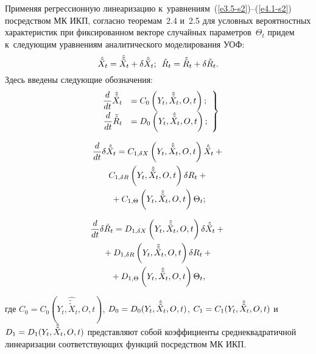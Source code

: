 \begin{multicols}{2}
Применяя регрессионную линеаризацию к~уравнениям~(\ref{e3.5-s2})--(\ref{e4.1-s2}) посредством 
МК ИКП, согласно тео\-ре\-мам~2.4 и~2.5 для условных вероятностных характеристик при 
фиксированном векторе случайных па\-ра\-мет\-ров~$\Theta_t$ придем к~сле\-ду\-ющим 
уравнениям аналитического моделирования УОФ:
  \begin{equation}
  \hat{\tilde X}_t = \hat{\tilde{\tilde X}}_t +\delta \hat{\tilde 
X}_t;\enskip \tilde R_t =\tilde{\tilde R}_t + \delta \tilde R_t.
\label{e4.9-s2}
\end{equation}
Здесь введены следующие обозначения:
\begin{equation}
\left.
\begin{array}{rl}
\displaystyle\frac{\displaystyle d\mathstrut}{\displaystyle dt\mathstrut}\hat{\tilde{\tilde X}}_t &= C_0 \left(Y_t, \hat{\tilde{\tilde X}}_t, O, t\right);\\[6pt]
\displaystyle\frac{\displaystyle d\mathstrut}{\displaystyle dt\mathstrut}\tilde{\tilde R}_t &= D_0 \left(Y_t, \hat{\tilde{\tilde  X}}_t, O, t\right);
\end{array}
\right\}
\label{e4.10-s2}
\end{equation}

\vspace*{-12pt}

\noindent
\begin{multline}
\displaystyle\frac{\displaystyle d\mathstrut}{\displaystyle dt\mathstrut}\delta\hat{\tilde X}_t = C_{1,\delta X} \left(Y_t,  \hat{\tilde{\tilde X}}_t, O, t\right) \hat{\tilde X}_t+{}\\
  C_{1,\delta R} \left(Y_t,  \hat{\tilde{\tilde X}}_t, O, t\right)\delta R_t +{}\\
{}+C_{1,\Theta} \left(Y_t, \hat{\tilde{\tilde X}}_t, O, t\right)\Theta_t;
\label{e4.11-s2}
\end{multline}

\vspace*{-12pt}

\noindent
\begin{multline}
\displaystyle\frac{\displaystyle d\mathstrut}{\displaystyle dt\mathstrut}\delta \tilde R_t = D_{1,\delta X} \left(Y_t, \hat{\tilde{\tilde X}}_t, O, t\right)\delta \hat{\tilde X}_t+ {}\\
{}+
D_{1,\delta R} \left(Y_t, \hat{\tilde{\tilde  X}}_t, O, t\right)\delta R_t+{}\\
{}+ D_{1,\Theta} \left(Y_t, \hat{\tilde{\tilde X}}_t, O, t\right)\Theta_t,
    \label{e4.12-s2}
    \end{multline}
    
    \vspace*{-3pt}

\noindent
где $C_0=C_0(Y_t, \hat{\tilde{\tilde X}}_t, O, t)$, $D_0 \hm= D_0 (Y_t, 
\hat{\tilde{\tilde X}}_t, O, t)$, $C_1 \hm= C_1 (Y_t, \hat{\tilde{\tilde X}}_t, O, 
t)$ и~$D_1 \hm= D_1 (Y_t, \hat{\tilde{\tilde X}}_t, O, t)$ пред\-став\-ля\-ют собой 
коэффициенты среднеквадратичной линеаризации соответствующих функций посредством 
МК ИКП.


\end{multicols}
